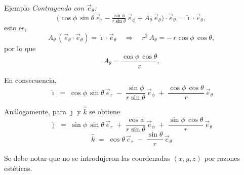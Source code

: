\documentclass[../apunte_mecanica_clasica.tex]{subfiles}%
\begin{document}
\begin{apuntebloque}{Ejemplo}
\emph{Contrayendo con $\vec{e}_\theta$:}
\begin{equation*}
\big(\cos\phi\,\sin\theta\,\vec{e}_r - \tfrac{\sin\phi}{r\sin\theta}\,\vec{e}_\phi + A_\theta\,\vec{e}_\theta\big)\!\cdot\!\vec{e}_\theta
= \hat{\imath}\!\cdot\!\vec{e}_\theta,
\end{equation*}
esto es,
\begin{equation*}
A_\theta\,(\vec{e}_\theta\!\cdot\!\vec{e}_\theta) = \hat{\imath}\!\cdot\!\vec{e}_\theta
\quad\Rightarrow\quad
r^2\,A_\theta = -\,r\cos\phi\,\cos\theta,
\end{equation*}
por lo que
\begin{equation*}
A_\theta = \frac{\cos\phi\,\cos\theta}{r}.
\end{equation*}

En consecuencia,
\begin{equation*}
\boxed{\;
\hat{\imath} \;=\; \cos\phi\,\sin\theta\,\vec{e}_r \;-\; \frac{\sin\phi}{r\sin\theta}\,\vec{e}_\phi
\;+\; \frac{\cos\phi\,\cos\theta}{r}\,\vec{e}_\theta \;}
\end{equation*}

Análogamente, para $\hat{\jmath}$ y $\hat{k}$ se obtiene
\begin{equation*}
\boxed{\;
\hat{\jmath} \;=\; \sin\phi\,\sin\theta\,\vec{e}_r \;+\; \frac{\cos\phi}{r\sin\theta}\,\vec{e}_\phi
\;+\; \frac{\sin\phi\,\cos\theta}{r}\,\vec{e}_\theta \;}
\end{equation*}
\begin{equation*}
\boxed{\;
\hat{k} \;=\; \cos\theta\,\vec{e}_r \;-\; \frac{\sin\theta}{r}\,\vec{e}_\theta \;}
\end{equation*}

Se debe notar que no se introdujeron las coordenadas $(x,y,z)$ por razones estéticas.


\end{apuntebloque}
\end{document}
